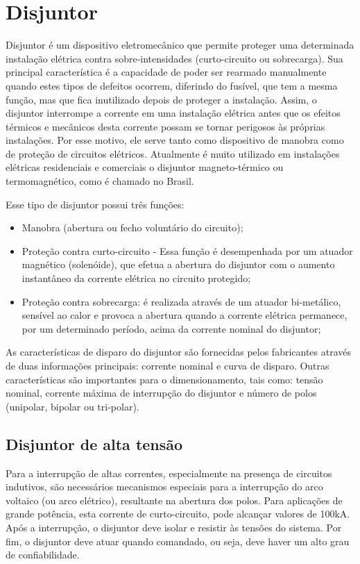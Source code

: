 \documentclass[a5paper,english,spanish,brazil]{ufsc-thesis}
\begin{document}
\section{Disjuntor}
Disjuntor é um dispositivo eletromecânico que permite proteger uma determinada instalação elétrica contra sobre-intensidades (curto-circuito ou sobrecarga). Sua principal característica é a capacidade de poder ser rearmado manualmente quando estes tipos de defeitos ocorrem, diferindo do fusível, que tem a mesma função, mas que fica inutilizado depois de proteger a instalação. Assim, o disjuntor interrompe a corrente em uma instalação elétrica antes que os efeitos térmicos e mecânicos desta corrente possam se tornar perigosos às próprias instalações. Por esse motivo, ele serve tanto como dispositivo de manobra como de proteção de circuitos elétricos. Atualmente é muito utilizado em instalações elétricas residenciais e comerciais o disjuntor magneto-térmico ou termomagnético, como é chamado no Brasil.\par
Esse tipo de disjuntor possui três funções:
\begin{itemize}
\item Manobra (abertura ou fecho voluntário do circuito);
\item Proteção contra curto-circuito - Essa função é desempenhada por um atuador magnético (solenóide), que efetua a abertura do disjuntor com o aumento instantâneo da corrente elétrica no circuito protegido;
\item Proteção contra sobrecarga: é realizada através de um atuador bi-metálico, sensível ao calor e provoca a abertura quando a corrente elétrica permanece, por um determinado período, acima da corrente nominal do disjuntor; 
\end{itemize}\par
As características de disparo do disjuntor são fornecidas pelos fabricantes através de duas informações principais: corrente nominal e curva de disparo. Outras características são importantes para o dimensionamento, tais como: tensão nominal, corrente máxima de interrupção do disjuntor e número de polos (unipolar, bipolar ou tri-polar).\par

\subsection{Disjuntor de alta tensão}
Para a interrupção de altas correntes, especialmente na presença de circuitos indutivos, são necessários mecanismos especiais para a interrupção do arco voltaico (ou arco elétrico), resultante na abertura dos polos. Para aplicações de grande potência, esta corrente de curto-circuito, pode alcançar valores de 100kA. Após a interrupção, o disjuntor deve isolar e resistir às tensões do sistema. Por fim, o disjuntor deve atuar quando comandado, ou seja, deve haver um alto grau de confiabilidade.\par
\end{document}
